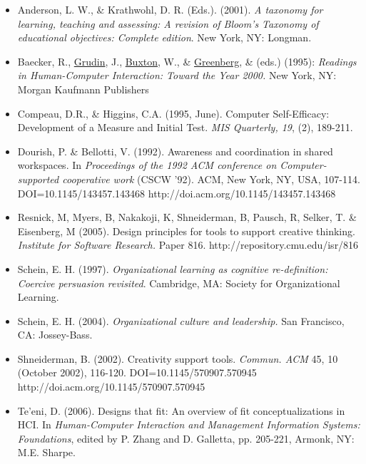 \begin{itemize}
\item
  Anderson, L. W., \& Krathwohl, D. R. (Eds.). (2001). \emph{A taxonomy
  for learning, teaching and assessing: A revision of Bloom's Taxonomy
  of educational objectives: Complete edition}. New York, NY: Longman.
\item
  \href{http://www.interaction-design.org/references/authors/ronald\_m\_\_baecker.html}{}Baecker,
  R.,
  \href{http://www.interaction-design.org/references/authors/jonathan\_grudin.html}{Grudin},
  J.,
  \href{http://www.interaction-design.org/references/authors/william\_buxton.html}{Buxton},
  W., \&
  \href{http://www.interaction-design.org/references/authors/saul\_greenberg.html}{Greenberg},
  \& (eds.) (1995): \emph{Readings in Human-Computer Interaction: Toward
  the Year 2000.} New York, NY: Morgan Kaufmann Publishers
\item
  Compeau, D.R., \& Higgins, C.A. (1995, June). Computer Self-Efficacy:
  Development of a Measure and Initial Test. \emph{MIS Quarterly, 19},
  (2), 189-211.
\item
  Dourish, P. \& Bellotti, V. (1992). Awareness and coordination in
  shared workspaces. In \emph{Proceedings of the 1992 ACM conference on
  Computer-supported cooperative work} (CSCW '92). ACM, New York, NY,
  USA, 107-114. DOI=10.1145/143457.143468
  http://doi.acm.org/10.1145/143457.143468
\item
  Resnick, M, Myers, B, Nakakoji, K, Shneiderman, B, Pausch, R, Selker,
  T. \& Eisenberg, M (2005). Design principles for tools to support
  creative thinking. \emph{Institute for Software Research.} Paper 816.
  http://repository.cmu.edu/isr/816
\item
  Schein, E. H. (1997). \emph{Organizational learning as cognitive
  re-definition: Coercive persuasion revisited}. Cambridge, MA: Society
  for Organizational Learning.
\item
  Schein, E. H. (2004). \emph{Organizational culture and leadership.}
  San Francisco, CA: Jossey-Bass.
\item
  Shneiderman, B. (2002). Creativity support tools. \emph{Commun. ACM}
  45, 10 (October 2002), 116-120. DOI=10.1145/570907.570945
  http://doi.acm.org/10.1145/570907.570945
\item
  Te'eni, D. (2006). Designs that fit: An overview of fit
  conceptualizations in HCI. In \emph{Human-Computer Interaction and
  Management Information Systems: Foundations}, edited by P. Zhang and
  D. Galletta, pp. 205-221, Armonk, NY: M.E. Sharpe.
\end{itemize}

